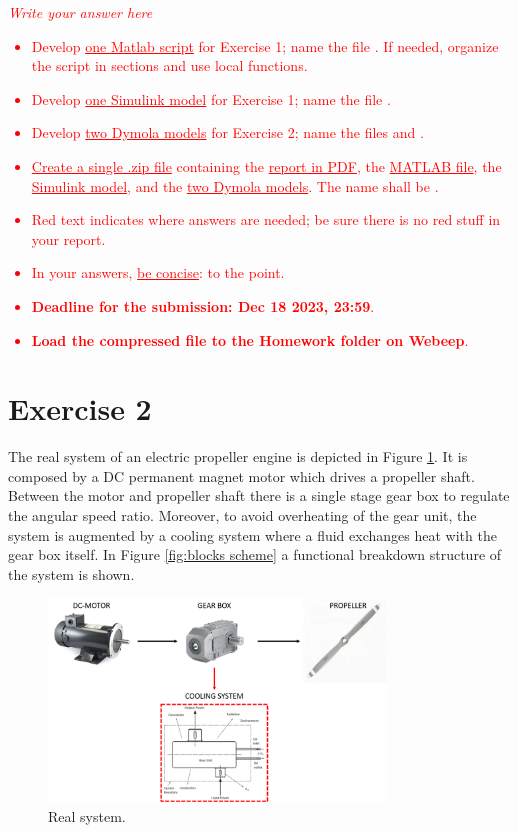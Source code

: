 \documentclass[11pt,a4paper,oneside]{article}
\newcommand{\tr}{\textcolor{red}}
\begin{document}
\tr{\textit{Write your answer here}}
\tr{
\begin{itemize}
\item Develop \underline{one Matlab script} for Exercise 1; name the file . If needed, organize the script in sections and use local functions. 
\item Develop \underline{one Simulink model} for Exercise 1; name the file . 
\item Develop \underline{two Dymola models} for Exercise 2; name the files  and  . 
\item \underline{Create a single .zip file} containing the \underline{report in PDF}, the \underline{MATLAB file}, the \underline{Simulink model}, and the \underline{two Dymola models}. The name shall be .
\item Red text indicates where answers are needed; be sure there is no red stuff in your report.
\item In your answers, \underline{be concise}: to the point.
\item \textbf{Deadline for the submission: Dec 18 2023, 23:59}.
\item \textbf{Load the compressed file to the Homework folder on Webeep}.
\end{itemize}
}

\section*{Exercise 2}
The real system of an electric propeller engine is depicted in Figure \ref{fig:propeller}. It is composed by a DC permanent magnet motor which drives a propeller shaft. Between the motor and propeller shaft there is a single stage gear box to regulate the angular speed ratio. Moreover, to avoid overheating of the gear unit, the system is augmented by a cooling system where a fluid exchanges heat with the gear box itself. In Figure \ref{fig:blocks scheme} a functional breakdown structure of the system is shown. 



\begin{figure}[h!]
\centering
\includegraphics[width=0.8\textwidth]{RealSystem_msas.png}
\caption{\label{fig:propeller} Real system.}
\end{figure}
\end{document}
